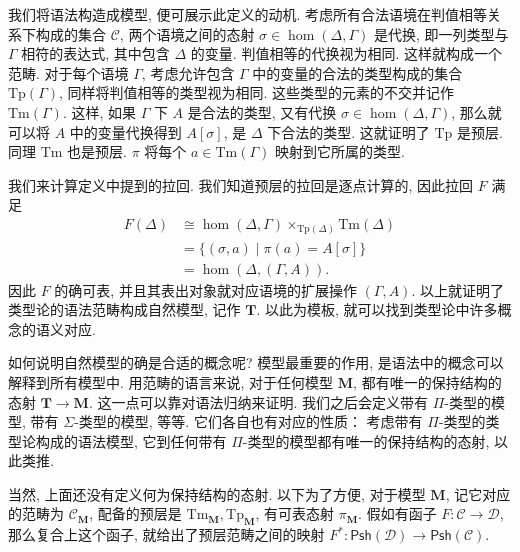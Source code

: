我们将语法构造成模型, 便可展示此定义的动机.
考虑所有合法语境在判值相等关系下构成的集合 \(\mathcal C\),
两个语境之间的态射 \(\sigma \in \hom(\Delta, \Gamma)\) 是代换,
即一列类型与 \(\Gamma\) 相符的表达式, 其中包含 \(\Delta\) 的变量.
判值相等的代换视为相同. 这样就构成一个范畴.
对于每个语境 \(\Gamma\),
考虑允许包含 \(\Gamma\) 中的变量的合法的类型构成的集合 \(\mathrm{Tp}(\Gamma)\),
同样将判值相等的类型视为相同.
这些类型的元素的不交并记作 \(\mathrm{Tm}(\Gamma)\).
这样, 如果 \(\Gamma\) 下 \(A\) 是合法的类型,
又有代换 \(\sigma \in \hom(\Delta, \Gamma)\),
那么就可以将 \(A\) 中的变量代换得到 \(A[\sigma]\),
是 \(\Delta\) 下合法的类型.
这就证明了 \(\mathrm{Tp}\) 是预层. 同理 \(\mathrm{Tm}\) 也是预层.
\(\pi\) 将每个 \(a \in \mathrm{Tm}(\Gamma)\) 映射到它所属的类型.

我们来计算定义中提到的拉回. 我们知道预层的拉回是逐点计算的,
因此拉回 \(F\) 满足
\begin{align*}
F(\Delta)
&\cong \hom(\Delta, \Gamma) \times_{\mathrm{Tp}(\Delta)} \mathrm{Tm}(\Delta)\\
&= \{(\sigma, a) \mid \pi(a) = A[\sigma]\}\\
&= \hom(\Delta, (\Gamma, A)).
\end{align*}
因此 \(F\) 的确可表, 并且其表出对象就对应语境的扩展操作 \((\Gamma, A)\).
以上就证明了类型论的语法范畴构成自然模型, 记作 \(\mathbf T\).
以此为模板, 就可以找到类型论中许多概念的语义对应.

如何说明自然模型的确是合适的概念呢?
模型最重要的作用, 是语法中的概念可以解释到所有模型中.
用范畴的语言来说, 对于任何模型 \(\mathbf M\),
都有唯一的保持结构的态射 \(\mathbf T \to \mathbf M\).
这一点可以靠对语法归纳来证明.
我们之后会定义带有 \(\Pi\)-类型的模型, 带有 \(\Sigma\)-类型的模型, 等等.
它们各自也有对应的性质：
考虑带有 \(\Pi\)-类型的类型论构成的语法模型,
它到任何带有 \(\Pi\)-类型的模型都有唯一的保持结构的态射,
以此类推.

当然, 上面还没有定义何为保持结构的态射.
以下为了方便, 对于模型 \(\mathbf M\),
记它对应的范畴为 \(\mathcal C_{\mathbf M}\),
配备的预层是 \(\mathrm{Tm}_{\mathbf M}, \mathrm{Tp}_{\mathbf M}\),
有可表态射 \(\pi_{\mathbf M}\).
假如有函子 \(F : \mathcal C \to \mathcal D\),
那么复合上这个函子, 就给出了预层范畴之间的映射
\(F^* : \mathsf{Psh}(\mathcal D) \to \mathsf{Psh}(\mathcal C)\).

